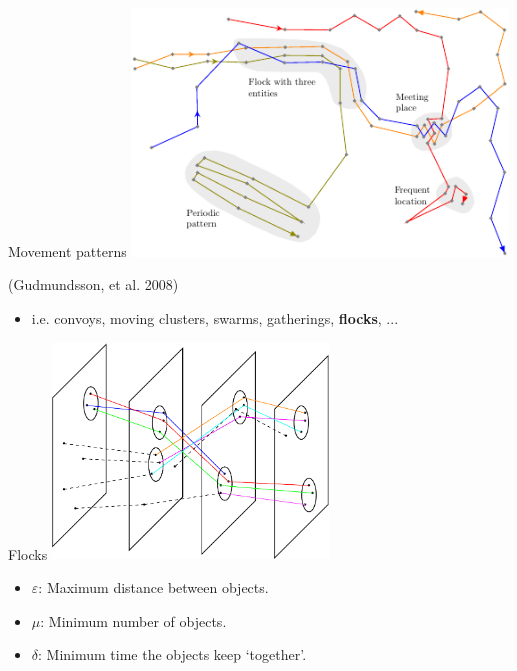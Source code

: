 \documentclass{beamer}
\begin{document}
    \begin{frame}{Movement patterns}
        \centering
        \includegraphics[width=0.75\textwidth]{../thesis/chapter4/figures/Patterns/patterns}
        \begin{flushright}
            {\tiny (Gudmundsson, et al. 2008)}
        \end{flushright}


        \begin{itemize} \item i.e. convoys, moving clusters, swarms, gatherings, \textbf{flocks}, ... \end{itemize} \vspace{0.5cm}
    \end{frame}

    \begin{frame}{Flocks}
        \centering
        \includegraphics[width=0.55\textwidth]{figures/flock}

        \begin{itemize}
            \item $\varepsilon$: Maximum distance between objects.
            \item $\mu$: Minimum number of objects.
            \item $\delta$: Minimum time the objects keep `together'.
        \end{itemize}
    \end{frame}
\end{document}

